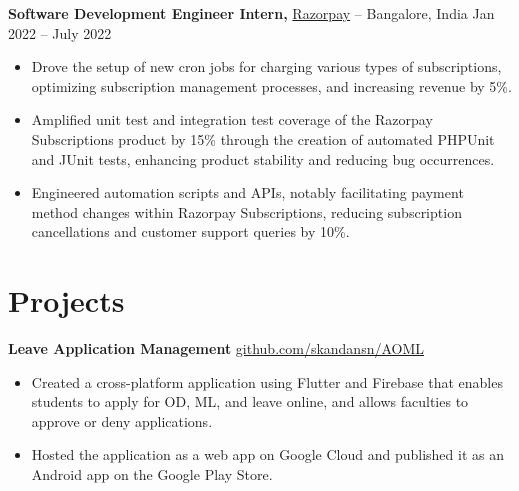 \documentclass[11pt]{article}       %
\begin{document}
\textbf{Software Development Engineer Intern,} \href{https://razorpay.com/}{Razorpay} -- Bangalore, India \hfill Jan 2022 -- July 2022 \\
\vspace{-9pt}
\begin{itemize}
  \label{sdei}

\item Drove the setup of new cron jobs for charging various types of subscriptions, optimizing subscription management processes, and increasing revenue by 5\%.\item Amplified unit test and integration test coverage of the Razorpay Subscriptions product by 15\% through the creation of automated PHPUnit and JUnit tests, enhancing product stability and reducing bug occurrences.\item Engineered automation scripts and APIs, notably facilitating payment method changes within Razorpay Subscriptions, reducing subscription cancellations and customer support queries by 10\%.\end{itemize}


\vspace{-18.5pt}

\section*{Projects}
\textbf{Leave Application Management} \hfill \href{https://github.com/skandansn/AOML}{github.com/skandansn/AOML} \\
\vspace{-9pt}
\begin{itemize}
  \label{projects1}

\item Created a cross-platform application using Flutter and Firebase that enables students to apply for OD, ML, and leave online, and allows faculties to approve or deny applications.\item Hosted the application as a web app on Google Cloud and published it as an Android app on the Google Play Store.\end{itemize}
\end{document}
